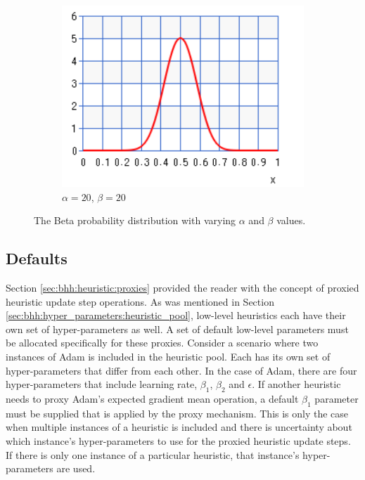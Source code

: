 \begin{figure}[htbp]
      \par\bigskip
      \begin{subfigure}{0.49\textwidth}
            \centering
            \centering
            \includegraphics[width=\textwidth]{images/beta_20_20.pdf}
            \caption{$\alpha=20$, $\beta=20$}
            \label{sec:bhh:hyper_parameters:normalisation_beta_20_20}
      \end{subfigure}
      \par\bigskip
      \caption{The Beta probability distribution with varying $\alpha$ and $\beta$ values.}
      \label{sec:bhh:hyper_parameters:discounted_rewards:normalisation}
\end{figure}

\subsection{Defaults}
\label{sec:bhh:hyper_parameters:defaults}

Section \ref{sec:bhh:heuristic:proxies} provided the reader with the concept of proxied heuristic update step operations. As was mentioned in Section \ref{sec:bhh:hyper_parameters:heuristic_pool}, low-level heuristics each have their own set of hyper-parameters as well. A set of default low-level parameters must be allocated specifically for these proxies. Consider a scenario where two instances of \acs{Adam} is included in the heuristic pool. Each has its own set of hyper-parameters that differ from each other. In the case of \acs{Adam}, there are four hyper-parameters that include learning rate, $\beta_{1}$, $\beta_{2}$ and $\epsilon$. If another heuristic needs to proxy \acs{Adam}'s expected gradient mean operation, a default $\beta_{1}$ parameter must be supplied that is applied by the proxy mechanism. This is only the case when multiple instances of a heuristic is included and there is uncertainty about which instance's hyper-parameters to use for the proxied heuristic update steps. If there is only one instance of a particular heuristic, that instance's hyper-parameters are used.

